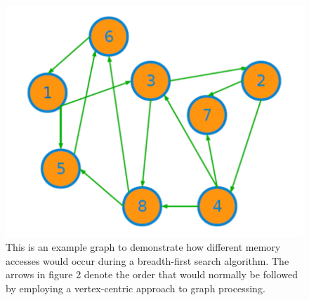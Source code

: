 \documentclass[conference]{IEEEtran}
\begin{document}
\begin{figure}
\includegraphics[scale=0.5]{figures/graph_ex.png}
\caption{This is an example graph to demonstrate how different memory accesses would occur during a breadth-first search algorithm.  The arrows in figure 2 denote the order that would normally be followed by employing a vertex-centric approach to graph processing.  }
\end{figure}
\end{document}
